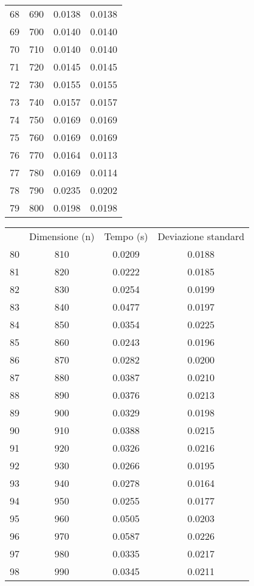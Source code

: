 \begin{table}
\begin{adjustbox}{width=1\textwidth/2}
\begin{tabular}{|c|c|c|c|}
68 & 690 & 0.0138 & 0.0138 \\
\cline{1-4}
69 & 700 & 0.0140 & 0.0140 \\
\cline{1-4}
70 & 710 & 0.0140 & 0.0140 \\
\cline{1-4}
71 & 720 & 0.0145 & 0.0145 \\
\cline{1-4}
72 & 730 & 0.0155 & 0.0155 \\
\cline{1-4}
73 & 740 & 0.0157 & 0.0157 \\
\cline{1-4}
74 & 750 & 0.0169 & 0.0169 \\
\cline{1-4}
75 & 760 & 0.0169 & 0.0169 \\
\cline{1-4}
76 & 770 & 0.0164 & 0.0113 \\
\cline{1-4}
77 & 780 & 0.0169 & 0.0114 \\
\cline{1-4}
78 & 790 & 0.0235 & 0.0202 \\
\cline{1-4}
79 & 800 & 0.0198 & 0.0198 \\
\cline{1-4}
\end{tabular}
\end{adjustbox}
\end{table}

\begin{table}
\centering
\begin{adjustbox}{width=1\textwidth/2}
\begin{tabular}{|c|c|c|c|}
\hline
 & Dimensione (n) & Tempo (s) & Deviazione standard \\
80 & 810 & 0.0209 & 0.0188 \\
\cline{1-4}
81 & 820 & 0.0222 & 0.0185 \\
\cline{1-4}
82 & 830 & 0.0254 & 0.0199 \\
\cline{1-4}
83 & 840 & 0.0477 & 0.0197 \\
\cline{1-4}
84 & 850 & 0.0354 & 0.0225 \\
\cline{1-4}
85 & 860 & 0.0243 & 0.0196 \\
\cline{1-4}
86 & 870 & 0.0282 & 0.0200 \\
\cline{1-4}
87 & 880 & 0.0387 & 0.0210 \\
\cline{1-4}
88 & 890 & 0.0376 & 0.0213 \\
\cline{1-4}
89 & 900 & 0.0329 & 0.0198 \\
\cline{1-4}
90 & 910 & 0.0388 & 0.0215 \\
\cline{1-4}
91 & 920 & 0.0326 & 0.0216 \\
\cline{1-4}
92 & 930 & 0.0266 & 0.0195 \\
\cline{1-4}
93 & 940 & 0.0278 & 0.0164 \\
\cline{1-4}
94 & 950 & 0.0255 & 0.0177 \\
\cline{1-4}
95 & 960 & 0.0505 & 0.0203 \\
\cline{1-4}
96 & 970 & 0.0587 & 0.0226 \\
\cline{1-4}
97 & 980 & 0.0335 & 0.0217 \\
\cline{1-4}
98 & 990 & 0.0345 & 0.0211 \\
\cline{1-4}
\end{tabular}
\end{adjustbox}
\end{table}
